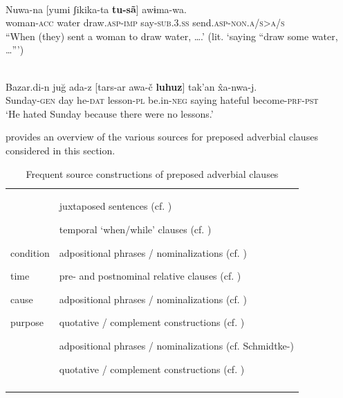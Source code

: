 \documentclass[output=paper]{langsci/langscibook}
\begin{document}
\ea\label{ex:key:}
\\
\gll   Nuwa-na  [yumi  ʃikika-ta  \textbf{tu-sã}]  awɨma-wa.\\
       woman-\textsc{acc}  water  draw.\textsc{asp-imp}  say-\textsc{sub.3.ss}  send.\textsc{asp-non.a/s>a/s}\\
\glt “When (they) sent a woman to draw water, ….' (lit. ‘saying “draw some water, …”’) 
\z

\ea\label{ex:key:}
\\
\gll   Bazar.di-n  juğ  ada-z  [tars-ar  awa-č   \textbf{luhuz}]  tak’an  \^{x}a-nwa-j.\\
       Sunday-\textsc{gen}  day  he-\textsc{dat}  lesson-\textsc{pl}  be.in-\textsc{neg}   saying  hateful  become-\textsc{prf-pst}\\
\glt   `He hated Sunday because there were no lessons.'
\z

 provides an overview of the various sources for preposed adverbial clauses considered in this section.

\begin{table}
\begin{tabularx}{\textwidth}{QQ}
\lsptoprule

condition

time

cause

purpose & juxtaposed sentences (cf. \citealt{Haiman1985})

temporal ‘when/while’ clauses (cf. \citealt{Traugott1985})

adpositional phrases / nominalizations (cf. \citealt{Genetti1991})

pre- and postnominal relative clauses (cf. \citealt{Givón1991})

adpositional phrases / nominalizations (cf. \citealt{Genetti1991})

quotative / complement constructions (cf. \citealt{Ebert1991})

adpositional phrases / nominalizations (cf. Schmidtke-\citealt{Bode2009})

quotative / complement constructions (cf. \citealt{Güldemann2008})\\
\lspbottomrule
\end{tabularx}

\caption{Frequent source constructions of preposed adverbial clauses}
\label{tab:diessel:4}
\end{table}
\end{document}
